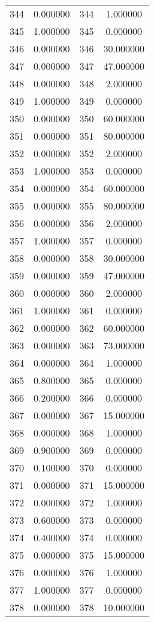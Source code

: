 \documentclass[12pt]{article}
\begin{document}
\begin{longtable}{@{}cccc@{}}
344 & 0.000000 & 344 & 1.000000 \\
345 & 1.000000 & 345 & 0.000000 \\
346 & 0.000000 & 346 & 30.000000 \\
347 & 0.000000 & 347 & 47.000000 \\
348 & 0.000000 & 348 & 2.000000 \\
349 & 1.000000 & 349 & 0.000000 \\
350 & 0.000000 & 350 & 60.000000 \\
351 & 0.000000 & 351 & 80.000000 \\
352 & 0.000000 & 352 & 2.000000 \\
353 & 1.000000 & 353 & 0.000000 \\
354 & 0.000000 & 354 & 60.000000 \\
355 & 0.000000 & 355 & 80.000000 \\
356 & 0.000000 & 356 & 2.000000 \\
357 & 1.000000 & 357 & 0.000000 \\
358 & 0.000000 & 358 & 30.000000 \\
359 & 0.000000 & 359 & 47.000000 \\
360 & 0.000000 & 360 & 2.000000 \\
361 & 1.000000 & 361 & 0.000000 \\
362 & 0.000000 & 362 & 60.000000 \\
363 & 0.000000 & 363 & 73.000000 \\
364 & 0.000000 & 364 & 1.000000 \\
365 & 0.800000 & 365 & 0.000000 \\
366 & 0.200000 & 366 & 0.000000 \\
367 & 0.000000 & 367 & 15.000000 \\
368 & 0.000000 & 368 & 1.000000 \\
369 & 0.900000 & 369 & 0.000000 \\
370 & 0.100000 & 370 & 0.000000 \\
371 & 0.000000 & 371 & 15.000000 \\
372 & 0.000000 & 372 & 1.000000 \\
373 & 0.600000 & 373 & 0.000000 \\
374 & 0.400000 & 374 & 0.000000 \\
375 & 0.000000 & 375 & 15.000000 \\
376 & 0.000000 & 376 & 1.000000 \\
377 & 1.000000 & 377 & 0.000000 \\
378 & 0.000000 & 378 & 10.000000 \\

\end{longtable}
\end{document}
